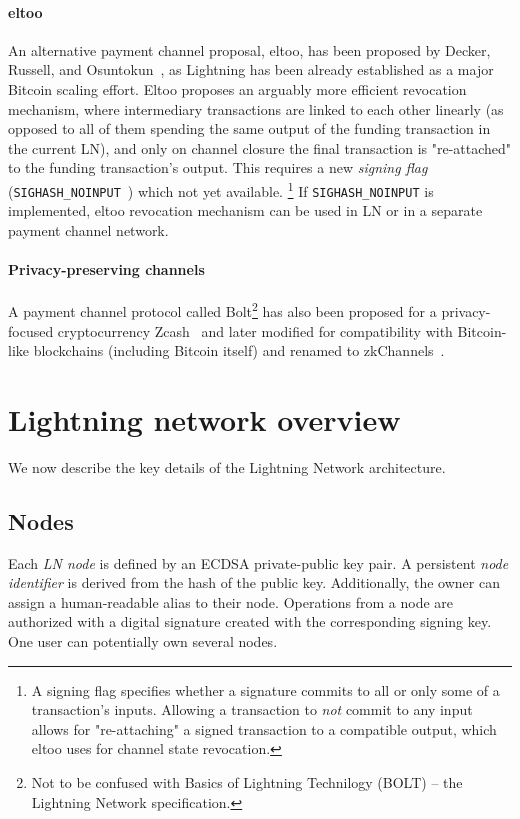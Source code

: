 \paragraph{eltoo}
An alternative payment channel proposal, eltoo, has been proposed by Decker, Russell, and Osuntokun~\cite{Decker2018}, as Lightning has been already established as a major Bitcoin scaling effort.
Eltoo proposes an arguably more efficient revocation mechanism, where intermediary transactions are linked to each other linearly (as opposed to all of them spending the same output of the funding transaction in the current LN), and only on channel closure the final transaction is "re-attached" to the funding transaction's output.
This requires a new \textit{signing flag} (\texttt{SIGHASH\_NOINPUT}~\cite{Decker2017}) which not yet available.
\footnote{A signing flag specifies whether a signature commits to all or only some of a transaction's inputs. Allowing a transaction to \textit{not} commit to any input allows for "re-attaching" a signed transaction to a compatible output, which eltoo uses for channel state revocation.}
If \texttt{SIGHASH\_NOINPUT} is implemented, eltoo revocation mechanism can be used in LN or in a separate payment channel network.

\paragraph{Privacy-preserving channels}
A payment channel protocol called Bolt\footnote{Not to be confused with Basics of Lightning Technilogy (BOLT) -- the Lightning Network specification.} has also been proposed for a privacy-focused cryptocurrency Zcash~\cite{Green2017} and later modified for compatibility with Bitcoin-like blockchains (including Bitcoin itself) and renamed to zkChannels~\cite{Akinyele2020}.



\section{Lightning network overview}

We now describe the key details of the Lightning Network architecture.

\subsection{Nodes}

Each \textit{LN node} is defined by an ECDSA private-public key pair.
A persistent \textit{node identifier} is derived from the hash of the public key. 
Additionally, the owner can assign a human-readable alias to their node.
Operations from a node are authorized with a digital signature created with the corresponding signing key.
One user can potentially own several nodes.

